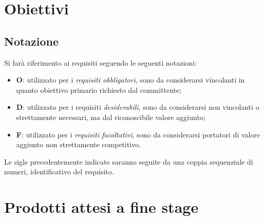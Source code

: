\section{Obiettivi}
\subsection{Notazione}
Si farà riferimento ai requisiti seguendo le seguenti notazioni:
\begin{itemize}
\item \textbf{O}: utilizzato per i \textit{requisiti obbligatori}, sono da considerarsi vincolanti in quanto obiettivo primario richiesto dal committente;
\item \textbf{D}: utilizzato per i requisiti \textit{desiderabili}, sono da considerarsi non vincolanti o strettamente necessari, ma dal riconoscibile valore
aggiunto;
\item \textbf{F}: utilizzato per i \textit{requisiti facoltativi}, sono da considerarsi portatori di valore aggiunto non strettamente competitivo.
\end{itemize}
Le sigle precedentemente indicate saranno seguite da una coppia sequenziale di numeri, identificativo del
requisito.

\pagebreak

\section{Prodotti attesi a fine stage}
